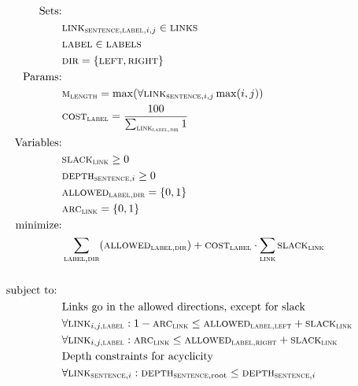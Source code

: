 \documentclass[11pt]{article}
\begin{document}
\begin{figure}[!htb]
  \small
  \begin{align*}
    \text{Sets:}&&\\
    &\textsc{link}_{\textsc{sentence},\textsc{label}, i,j} \in \textsc{links} &\\
    &\textsc{label} \in \textsc{labels}&\\ 
    &\textsc{dir} = \{\textsc{left}, \textsc{right}\} &\\
    \text{Params:}&&\\
    &\textsc{m}_\textsc{length} = \max (\forall{\textsc{link}_{\textsc{sentence}, i,j}} \max(i,j)) &\\
    &\textsc{cost}_{\textsc{label}} = \frac{100}{ \sum_{\textsc{link}_{\textsc{label},\textsc{dir}}}1 } &\\
    \text{Variables:}&&\\
    &\textsc{slack}_{\textsc{link}} \geq 0 &\\ 
    &\textsc{depth}_{\textsc{sentence},i} \geq 0 &\\
    &\textsc{allowed}_{\textsc{label},\textsc{dir}} = \{0,1\}&\\
    &\textsc{arc}_{\textsc{link}} = \{0,1\} &\\
    \text{minimize:}& &\\ 
    &\sum_{\textsc{label}, \textsc{dir}} (\textsc{allowed}_{\textsc{label},\textsc{dir}}) + \textsc{cost}_{\textsc{label}} \cdot \sum_\textsc{link} \textsc{slack}_{\textsc{link}} &\\
    &&\\
    \text{subject to: }& &\\
    &\text{Links go in the allowed directions, except for slack}&\\
    &\forall{\textsc{link}_{i,j,\textsc{label}}}: 1-\textsc{arc}_{\textsc{link}} \leq \textsc{allowed}_{\textsc{label}, \textsc{left}} + \textsc{slack}_{\textsc{link}} &\\
    &\forall{\textsc{link}_{i,j,\textsc{label}}}: \textsc{arc}_{\textsc{link}} \leq \textsc{allowed}_{\textsc{label}, \textsc{right}} + \textsc{slack}_{\textsc{link}} &\\
    &\text{Depth constraints for acyclicity}&\\
    &\forall{\textsc{link}_{\textsc{sentence},i}}: \textsc{depth}_{\textsc{sentence},\text{root}} \leq \textsc{depth}_{\textsc{sentence},i} &\\

\end{align*}
\end{figure}
\end{document}
